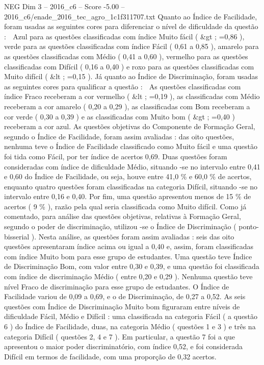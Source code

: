 \begin{textsample}{NEG Dim 3 – 2016\_c6 – Score -5.00 – 2016\_c6/enade\_2016\_tec\_agro\_1c1f311707.txt}
Quanto ao Índice de Facilidade, foram usadas as seguintes cores para diferenciar o nível de dificuldade da questão :  Azul para as questões classificadas com índice Muito fácil ( \&gt ; =0,86 ), verde para as questões classificadas com índice Fácil ( 0,61 a 0,85 ), amarelo para as questões classificadas com Médio ( 0,41 a 0,60 ), vermelho para as questões classificadas com Difícil ( 0,16 a 0,40 ) e roxo para as questões classificadas com Muito difícil ( \&lt ; =0,15 ).
Já quanto ao Índice de Discriminação, foram usadas as seguintes cores para qualificar a questão :  As questões classificadas com índice Fraco receberam a cor vermelho ( \&lt ; =0,19 ), as classificadas com Médio receberam a cor amarelo ( 0,20 a 0,29 ), as classificadas com Bom receberam a cor verde ( 0,30 a 0,39 ) e as classificadas com Muito bom ( \&gt ; =0,40 ) receberam a cor azul.
As questões objetivas do Componente de Formação Geral, segundo o Índice de Facilidade, foram assim avaliadas : das oito questões, nenhuma teve o Índice de Facilidade classificado como Muito fácil e uma questão foi tida como Fácil, por ter índice de acertos 0,69.
Duas questões foram consideradas com índice de dificuldade Médio, situando -se no intervalo entre 0,41 e 0,60 do Índice de Facilidade, ou seja, houve entre 41,0 \% e 60,0 \% de acertos, enquanto quatro questões foram classificadas na categoria Difícil, situando -se no intervalo entre 0,16 e 0,40.
Por fim, uma questão apresentou menos de 15 \% de acertos ( 9 \% ), razão pela qual seria classificada como Muito difícil.
Como já comentado, para análise das questões objetivas, relativas à Formação Geral, segundo o poder de discriminação, utilizou -se o Índice de Discriminação ( ponto-bisserial ).
Nesta análise, as questões foram assim avaliadas : seis das oito questões apresentaram índice acima ou igual a 0,40 e, assim, foram classificadas com índice Muito bom para esse grupo de estudantes.
Uma questão teve Índice de Discriminação Bom, com valor entre 0,30 e 0,39, e uma questão foi classificada com índice de discriminação Médio ( entre 0,20 e 0,29 ).
Nenhuma questão teve nível Fraco de discriminação para esse grupo de estudantes.
O Índice de Facilidade variou de 0,09 a 0,69, e o de Discriminação, de 0,27 a 0,52.
As seis questões com Índice de Discriminação Muito bom figuraram entre níveis de dificuldade Fácil, Médio e Difícil : uma classificada na categoria Fácil ( a questão 6 ) do Índice de Facilidade, duas, na categoria Médio ( questões 1 e 3 ) e três na categoria Difícil ( questões 2, 4 e 7 ).
Em particular, a questão 7 foi a que apresentou o maior poder discriminatório, com índice 0,52, e foi considerada Difícil em termos de facilidade, com uma proporção de 0,32 acertos.

\end{textsample}
